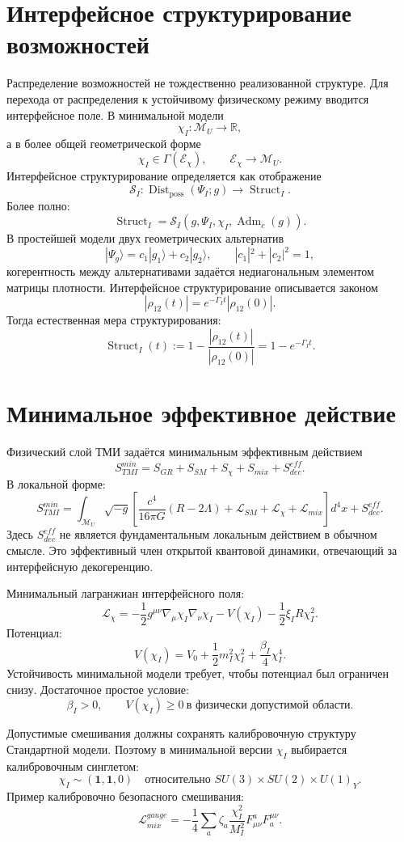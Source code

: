 \documentclass[12pt,a4paper]{article}
\DeclareMathOperator{\Adm}{Adm}
\DeclareMathOperator{\Struct}{Struct}
\DeclareMathOperator{\Dist}{Dist}
\newcommand{\M}{\mathcal M_U}
\newcommand{\Lag}{\mathcal L}
\begin{document}
\section{Интерфейсное структурирование возможностей}
Распределение возможностей не тождественно реализованной структуре. Для перехода от распределения к устойчивому физическому режиму вводится интерфейсное поле. В минимальной модели
\[
\boxed{\chi_I:\M\to\mathbb R,}
\]
а в более общей геометрической форме
\[
\boxed{\chi_I\in\Gamma(\mathcal E_\chi),\qquad \mathcal E_\chi\to\M.}
\]
Интерфейсное структурирование определяется как отображение
\[
\boxed{
\mathcal S_I:\Dist_{\mathrm{poss}}(\Psi_I;g)\longrightarrow\Struct_I.
}
\]
Более полно:
\[
\boxed{
\Struct_I=\mathcal S_I(g,\Psi_I,\chi_I,\Adm_c(g)).
}
\]
В простейшей модели двух геометрических альтернатив
\[
 |\Psi_g\rangle=c_1|g_1\rangle+c_2|g_2\rangle,
 \qquad |c_1|^2+|c_2|^2=1,
\]
когерентность между альтернативами задаётся недиагональным элементом матрицы плотности. Интерфейсное структурирование описывается законом
\[
\boxed{
 |\rho_{12}(t)|=e^{-\Gamma_I t}|\rho_{12}(0)|.
}
\]
Тогда естественная мера структурирования:
\[
\boxed{
\Struct_I(t):=1-\frac{|\rho_{12}(t)|}{|\rho_{12}(0)|}=1-e^{-\Gamma_I t}.
}
\]

\section{Минимальное эффективное действие}
Физический слой ТМИ задаётся минимальным эффективным действием
\[
\boxed{S_{TMI}^{min}=S_{GR}+S_{SM}+S_\chi+S_{mix}+S_{dec}^{eff}.}
\]
В локальной форме:
\[
\boxed{
S_{TMI}^{min}=\int_{\M}\sqrt{-g}\left[
\frac{c^4}{16\pi G}(R-2\Lambda)+\Lag_{SM}+\Lag_\chi+\Lag_{mix}
\right]d^4x+S_{dec}^{eff}.
}
\]
Здесь $S_{dec}^{eff}$ не является фундаментальным локальным действием в обычном смысле. Это эффективный член открытой квантовой динамики, отвечающий за интерфейсную декогеренцию.

Минимальный лагранжиан интерфейсного поля:
\[
\boxed{
\Lag_\chi=-\frac12 g^{\mu\nu}\nabla_\mu\chi_I\nabla_\nu\chi_I
-V(\chi_I)-\frac12\xi_I R\chi_I^2.
}
\]
Потенциал:
\[
\boxed{
V(\chi_I)=V_0+\frac12m_I^2\chi_I^2+\frac{\beta_I}{4}\chi_I^4.
}
\]
Устойчивость минимальной модели требует, чтобы потенциал был ограничен снизу. Достаточное простое условие:
\[
\boxed{\beta_I>0,\qquad V(\chi_I)\geq0\ \text{в физически допустимой области}.}
\]

Допустимые смешивания должны сохранять калибровочную структуру Стандартной модели. Поэтому в минимальной версии $\chi_I$ выбирается калибровочным синглетом:
\[
\boxed{\chi_I\sim(\mathbf1,\mathbf1,0)\quad\text{относительно }SU(3)\times SU(2)\times U(1)_Y.}
\]
Пример калибровочно безопасного смешивания:
\[
\boxed{
\Lag_{mix}^{gauge}=-\frac14\sum_a\zeta_a\frac{\chi_I^2}{M_I^2}F^a_{\mu\nu}F_a^{\mu\nu}.
}
\]
\end{document}
